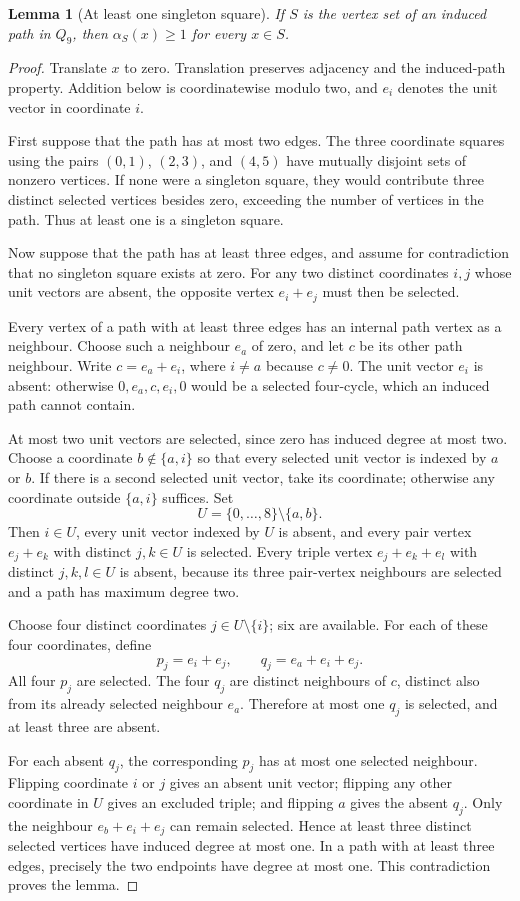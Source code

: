 \documentclass[11pt,a4paper]{article}
\newtheorem{lemma}[theorem]{Lemma}
\theoremstyle{definition}
\theoremstyle{remark}
\newcommand{\Q}{Q}
\begin{document}
\begin{lemma}[At least one singleton square]\label{lem:one-square}
If $S$ is the vertex set of an induced path in $\Q_9$, then $\alpha_S(x)\ge1$ for every $x\in S$.
\end{lemma}
\begin{proof}
Translate $x$ to zero. Translation preserves adjacency and the induced-path property. Addition below is coordinatewise modulo two, and $e_i$ denotes the unit vector in coordinate $i$.

First suppose that the path has at most two edges. The three coordinate squares using the pairs $(0,1)$, $(2,3)$, and $(4,5)$ have mutually disjoint sets of nonzero vertices. If none were a singleton square, they would contribute three distinct selected vertices besides zero, exceeding the number of vertices in the path. Thus at least one is a singleton square.

Now suppose that the path has at least three edges, and assume for contradiction that no singleton square exists at zero. For any two distinct coordinates $i,j$ whose unit vectors are absent, the opposite vertex $e_i+e_j$ must then be selected.

Every vertex of a path with at least three edges has an internal path vertex as a neighbour. Choose such a neighbour $e_a$ of zero, and let $c$ be its other path neighbour. Write $c=e_a+e_i$, where $i\ne a$ because $c\ne0$. The unit vector $e_i$ is absent: otherwise $0,e_a,c,e_i,0$ would be a selected four-cycle, which an induced path cannot contain.

At most two unit vectors are selected, since zero has induced degree at most two. Choose a coordinate $b\notin\{a,i\}$ so that every selected unit vector is indexed by $a$ or $b$. If there is a second selected unit vector, take its coordinate; otherwise any coordinate outside $\{a,i\}$ suffices. Set
\[
U=\{0,\ldots,8\}\setminus\{a,b\}.
\]
Then $i\in U$, every unit vector indexed by $U$ is absent, and every pair vertex $e_j+e_k$ with distinct $j,k\in U$ is selected. Every triple vertex $e_j+e_k+e_l$ with distinct $j,k,l\in U$ is absent, because its three pair-vertex neighbours are selected and a path has maximum degree two.

Choose four distinct coordinates $j\in U\setminus\{i\}$; six are available. For each of these four coordinates, define
\[
p_j=e_i+e_j,\qquad q_j=e_a+e_i+e_j.
\]
All four $p_j$ are selected. The four $q_j$ are distinct neighbours of $c$, distinct also from its already selected neighbour $e_a$. Therefore at most one $q_j$ is selected, and at least three are absent.

For each absent $q_j$, the corresponding $p_j$ has at most one selected neighbour. Flipping coordinate $i$ or $j$ gives an absent unit vector; flipping any other coordinate in $U$ gives an excluded triple; and flipping $a$ gives the absent $q_j$. Only the neighbour $e_b+e_i+e_j$ can remain selected. Hence at least three distinct selected vertices have induced degree at most one. In a path with at least three edges, precisely the two endpoints have degree at most one. This contradiction proves the lemma.
\end{proof}
\end{document}
